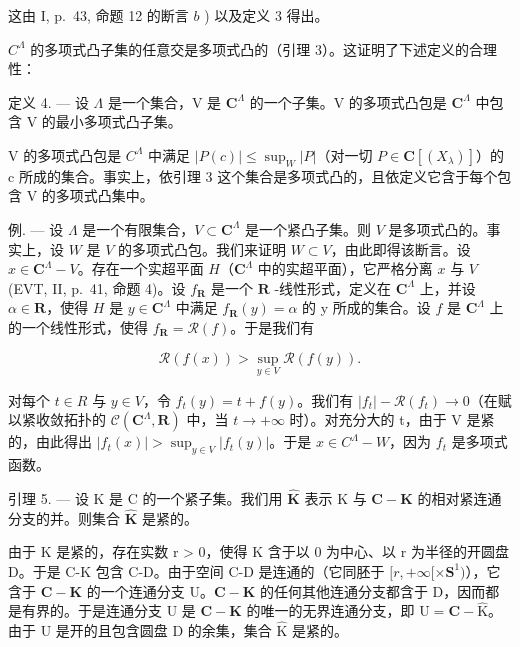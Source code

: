 这由 I, p.~43, 命题 12 的断言 \(b\) ) 以及定义 3 得出。

\(C^{\Lambda}\) 的多项式凸子集的任意交是多项式凸的（引理 3）。这证明了下述定义的合理性：

定义 4. --- 设 \(\Lambda\) 是一个集合，V 是 \(\mathbf{C}^{\Lambda}\) 的一个子集。V 的多项式凸包是 \(\mathbf{C}^{\Lambda}\) 中包含 V 的最小多项式凸子集。

V 的多项式凸包是 \(C^{\Lambda}\) 中满足 \(|P(c)| \leqslant \sup_{W} |P|\)（对一切 \(P \in \mathbf{C}[(X_{\lambda})]\)）的 c 所成的集合。事实上，依引理 3 这个集合是多项式凸的，且依定义它含于每个包含 V 的多项式凸集中。

例. --- 设 \(\Lambda\) 是一个有限集合，\(V \subset \mathbf{C}^{\Lambda}\) 是一个紧凸子集。则 \(V\) 是多项式凸的。事实上，设 \(W\) 是 \(V\) 的多项式凸包。我们来证明 \(W \subset V\)，由此即得该断言。设 \(x \in \mathbf{C}^{\Lambda} - V\)。存在一个实超平面 \(H\)（\(\mathbf{C}^{\Lambda}\) 中的实超平面），它严格分离 \(x\) 与 \(V\) (EVT, II, p.~41, 命题 4)。设 \(f_{\mathbf{R}}\) 是一个 \(\mathbf{R}\) -线性形式，定义在 \(\mathbf{C}^{\Lambda}\) 上，并设 \(\alpha \in \mathbf{R}\)，使得 \(H\) 是 \(y \in \mathbf{C}^{\Lambda}\) 中满足 \(f_{\mathbf{R}}(y) = \alpha\) 的 y 所成的集合。设 \(f\) 是 \(\mathbf{C}^{\Lambda}\) 上的一个线性形式，使得 \(f_{\mathbf{R}} = \mathcal{R}(f)\)。于是我们有

\[
\mathcal {R} (f (x)) > \sup _ {y \in V} \mathcal {R} (f (y)).
\]

对每个 \(t \in R\) 与 \(y \in V\)，令 \(f_{t}(y) = t + f(y)\)。我们有 \(|f_{t}| - \mathcal{R}(f_{t}) \to 0\)（在赋以紧收敛拓扑的 \(\mathcal{C}(\mathbf{C}^{\Lambda}, \mathbf{R})\) 中，当 \(t \to +\infty\) 时）。对充分大的 t，由于 V 是紧的，由此得出 \(|f_{t}(x)| > \sup_{y \in V} |f_{t}(y)|\)。于是 \(x \in C^{\Lambda} - W\)，因为 \(f_{t}\) 是多项式函数。

引理 5. --- 设 K 是 C 的一个紧子集。我们用 \(\widehat{\mathbf{K}}\) 表示 K 与 \(\mathbf{C} - \mathbf{K}\) 的相对紧连通分支的并。则集合 \(\widehat{\mathbf{K}}\) 是紧的。

由于 K 是紧的，存在实数 r > 0，使得 K 含于以 0 为中心、以 r 为半径的开圆盘 D。于是 C-K 包含 C-D。由于空间 C-D 是连通的（它同胚于 \([r, +\infty[\times\mathbf{S}^1)\)），它含于 \(\mathbf{C}-\mathbf{K}\) 的一个连通分支 U。\(\mathbf{C}-\mathbf{K}\) 的任何其他连通分支都含于 D，因而都是有界的。于是连通分支 U 是 \(\mathbf{C}-\mathbf{K}\) 的唯一的无界连通分支，即 \(\mathrm{U} = \mathbf{C}-\widehat{\mathrm{K}}\)。由于 U 是开的且包含圆盘 D 的余集，集合 \(\widehat{\mathrm{K}}\) 是紧的。

